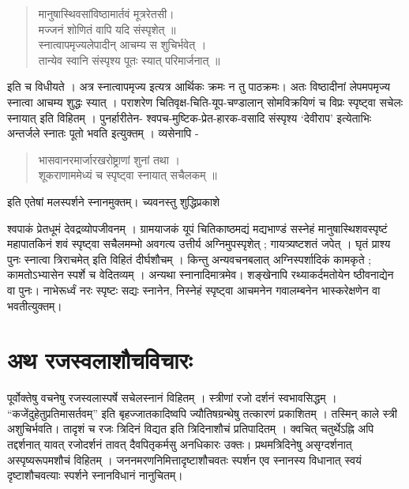 \begin{verse}
मानुषास्थिवसांविष्ठामार्तवं मूत्ररेतसी। \\
मज्जनं शोणितं वापि यदि संस्पृशेत् ॥ \\
स्नात्वापमृज्यलेपादीन् आचम्य स शुचिर्भवेत् ।\\ 
तान्येव स्वानि संस्पृश्य पूतः स्यात् परिमार्जनात् ॥
\end{verse}
इति च विधीयते । अत्र स्नात्वापमृज्य इत्यत्र आर्थिकः क्रमः न तु पाठक्रमः। अतः विष्ठादीनां लेपमपमृज्य स्नात्वा आचम्य शुद्धः स्यात् । पराशरेण चितिवृक्ष-चिति-यूप-चण्डालान् सोमविक्रयिणं च विप्रः स्पृष्ट्वा सचेलः स्नायात् इति विहितम् । पुनर्हारीतेन- श्वपच-मुष्टिक-प्रेत-हारक-वसादि संस्पृश्य ‘देवीराप’ इत्येताभिः अन्तर्जले स्नातः पूतो भवति इत्युक्तम् । व्यसेनापि - 
\begin{verse}
भासवानरमार्जारखरोष्ट्राणां शुनां तथा ।\\
शूकराणाममेध्यं च स्पृष्ट्वा स्नायात् सचैलकम् ॥  
\end{verse}
इति एतेषां मलस्पर्शने स्नानमुक्तम्। च्यवनस्तु शुद्धिप्रकाशे  

श्वपाकं प्रेतधूमं देवद्रव्योपजीवनम् । ग्रामयाजकं यूपं चितिकाष्ठमद्यं मद्यभाण्डं सस्नेहं मानुषास्थिशवस्पृष्टं महापातकिनं शवं स्पृष्ट्वा सचैलमम्भो अवगत्य उत्तीर्य अग्निमुपस्पृशेत् ; गायत्र्यष्टशतं जपेत् । घृतं प्राश्य पुनः स्नात्वा त्रिराचमेत् इति विहितं दीर्घशौचम् । किन्तु अन्यवचनबलात् अग्निस्पर्शादिकं कामकृते ; कामतोऽभ्यासेन स्पर्शे च वेदितव्यम् । अन्यथा स्नानादिमात्रमेव। शङ्खेनापि   रथ्याकर्दमतोयेन ष्ठीवनाद्येन वा पुनः। नाभेरूर्ध्वं नरः स्पृष्टः सद्यः स्नानेन, निस्नेहं स्पृष्ट्वा आचमनेन गवालम्बनेन भास्करेक्षणेन वा भवतीत्युक्तम्।

\section*{अथ रजस्वलाशौचविचारः}

पूर्वोक्तेषु वचनेषु रजस्वलास्पर्षे सचेलस्नानं विहितम् । स्त्रीणां रजो दर्शनं स्वभावसिद्धम् । “कजेंदुहेतुप्रतिमासर्तवम्” इति बृहज्जातकादिष्वपि ज्यौतिषग्रन्थेषु तत्कारणं प्रकाशितम् । तस्मिन् काले स्त्री अशुचिर्भवति। तादृशं च रजः त्रिदिनं विद्यत इति त्रिदिनाशौचं प्रतिपादितम् । क्वचित् चतुर्थेऽह्नि अपि तद्दर्शनात् यावत् रजोदर्शनं तावत् दैवपितृकर्मसु अनधिकारः उक्तः। प्रथमत्रिदिनेषु असृग्दर्शनात् अस्पृष्यरूपमशौचं विहितम् । जननमरणनिमित्तादृष्टाशौचवतः स्पर्शन एव स्नानस्य विधानात् स्वयं दृष्टाशौचवत्याः स्पर्शने स्नानविधानं नानुचितम्।

